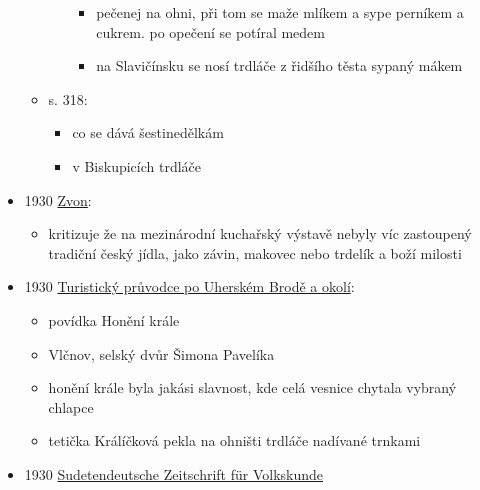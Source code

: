 \begin{itemize}
\begin{itemize}
\begin{itemize}
      \begin{itemize}
      \tightlist
      \item
        pečenej na ohni, při tom se maže mlíkem a sype perníkem a
        cukrem. po opečení se potíral medem
      \item
        na Slavičínsku se nosí trdláče z řidšího těsta sypaný mákem
      \end{itemize}
    \end{itemize}
  \item
    s. 318:

    \begin{itemize}
    \tightlist
    \item
      co se dává šestinedělkám
    \item
      v Biskupicích trdláče
    \end{itemize}
  \end{itemize}
\item
  1930
  \href{https://ceskadigitalniknihovna.cz/view/uuid:962edf50-9004-11e3-83a0-005056825209?page=uuid\%3Ac58d1770-9613-11e3-8b69-005056825209&fulltext=trdeln\%C3\%ADk\%20OR\%20trdeln\%C3\%ADky\%20OR\%20trdeln\%C3\%ADk\%C5\%AF&source=mzk}{Zvon}:

  \begin{itemize}
  \tightlist
  \item
    kritizuje že na mezinárodní kuchařský výstavě nebyly víc zastoupený
    tradiční český jídla, jako závin, makovec nebo trdelík a boží
    milosti
  \end{itemize}
\item
  1930
  \href{https://ceskadigitalniknihovna.cz/uuid/uuid:0ef229ae-ef9e-4c80-b6ca-8a7a99a85b67}{Turistický
  průvodce po Uherském Brodě a okolí}:

  \begin{itemize}
  \tightlist
  \item
    povídka Honění krále
  \item
    Vlčnov, selský dvůr Šimona Pavelíka
  \item
    honění krále byla jakási slavnost, kde celá vesnice chytala vybraný
    chlapce
  \item
    tetička Králíčková pekla na ohništi trdláče nadívané trnkami
  \end{itemize}
\item
  1930
  \href{https://ceskadigitalniknihovna.cz/uuid/uuid:c691a682-5723-11ee-b168-005056841fbb}{Sudetendeutsche
  Zeitschrift für Volkskunde}


\end{itemize}

